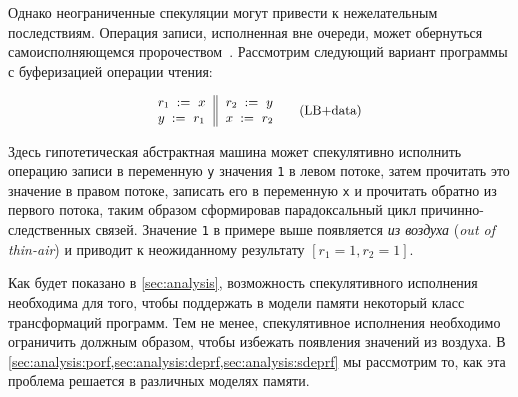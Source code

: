 Однако неограниченные спекуляции могут привести 
к нежелательным последствиям. 
Операция записи, исполненная вне очереди, может обернуться
самоисполняющемся пророчеством~\cite{Boehm-Demsky:MSPC14}. 
Рассмотрим следующий вариант программы с буферизацией операции чтения:

\begin{equation*}
\small
\inarrII{
  \readInst{}{r_1}{x}   \\
  \writeInst{}{y}{r_1}  \\
}{
  \readInst{}{r_2}{y}   \\
  \writeInst{}{x}{r_2}  \\
}
\tag{LB+data}\label{ex:lb+data}
\end{equation*}

Здесь гипотетическая абстрактная машина 
может спекулятивно исполнить операцию записи в переменную \texttt{y}
значения \texttt{1} в левом потоке, 
затем прочитать это значение в правом потоке, 
записать его в переменную \texttt{x} и прочитать обратно из 
первого потока, таким образом сформировав парадоксальный цикл 
причинно-следственных связей.  
Значение \texttt{1} в примере выше появляется \emph{из воздуха}
(\emph{out of thin-air}) и приводит 
к неожиданному результату ${[r_1=1, r_2=1]}$.

Как будет показано в \cref{sec:analysis},
возможность спекулятивного исполнения необходима для того, чтобы 
поддержать в модели памяти некоторый класс трансформаций программ. 
Тем не менее, спекулятивное исполнения необходимо 
ограничить должным образом, чтобы избежать 
появления значений из воздуха. 
В \cref{sec:analysis:porf,sec:analysis:deprf,sec:analysis:sdeprf}
мы рассмотрим то, как эта проблема решается в различных моделях памяти. 
